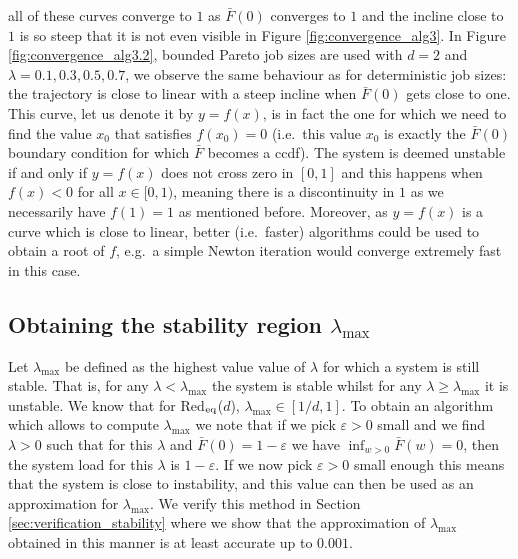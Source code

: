 \documentclass[12pt]{report}
\newcommand{\Redid}{Red$_{\textup{eq}}$($d$)}
\begin{document}
all of these curves converge to $1$ as $\bar F(0)$ converges to $1$ and  
the incline close to $1$ is so steep that it is not even visible in Figure \ref{fig:convergence_alg3}. 
In Figure \ref{fig:convergence_alg3.2}, bounded Pareto job sizes are used with $d=2$ and $\lambda = 0.1,0.3,0.5,0.7$, we observe the same behaviour as for deterministic job sizes: the trajectory is close to linear with a steep incline when $\bar F(0)$ gets close to one. This curve, let us denote it by $y=f(x)$, is in fact the one for which we need to find the value $x_0$ that satisfies $f(x_0)=0$ (i.e.~this value $x_0$ is exactly the $\bar F(0)$ boundary condition for which $\bar F$ becomes a ccdf). The system is deemed unstable if and only if $y=f(x)$ does not cross zero in $[0,1]$ and this happens when $f(x) < 0$ for all $x \in [0,1)$, meaning there is a discontinuity in $1$ as we necessarily have
$f(1)=1$ as mentioned before. Moreover, as $y=f(x)$ is a curve which is close to linear, better (i.e.~faster) algorithms could be used to obtain a root of $f$, e.g.~a simple Newton iteration would converge extremely fast in this case.

\subsection*{Obtaining the stability region $\lambda_{\max}$}
Let $\lambda_{\max}$ be defined as the highest value value of $\lambda$ for which a system is still stable. That is, for any $\lambda < \lambda_{\max}$ the system is stable whilst for any $\lambda \geq \lambda_{\max}$ it is unstable. We know that for \Redid , $\lambda_{\max} \in [1/d, 1]$. To obtain an algorithm which allows to compute $\lambda_{\max}$ we note that if we pick $\varepsilon > 0$ small and we find $\lambda > 0$ such that for this $\lambda$ and $\bar F(0) = 1-\varepsilon$ we have $\inf_{w>0} \bar F(w) = 0$, then the system load for this $\lambda$ is $1-\varepsilon$. If we now pick $\varepsilon > 0$ small enough this means that the system is close to instability, and this value can then be used as an approximation for $\lambda_{\max}$. We verify this method in Section \ref{sec:verification_stability} where we show that the approximation of $\lambda_{\max}$ obtained in this manner is at least accurate up to $0.001$.
\end{document}
